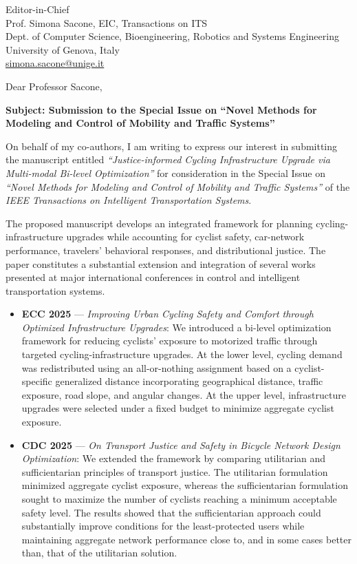 \documentclass[11pt]{letter}
\date{\today}
\begin{document}
\begin{letter}{%
Editor-in-Chief\\
Prof. Simona Sacone, EIC, Transactions on ITS\\
Dept. of Computer Science, Bioengineering, Robotics and Systems Engineering\\
University of Genova, Italy\\
\href{mailto:simona.sacone@unige.it}{simona.sacone@unige.it}
}

\opening{Dear Professor Sacone,}

\textbf{Subject: Submission to the Special Issue on
``Novel Methods for Modeling and Control of Mobility and Traffic Systems''}

On behalf of my co-authors, I am writing to express our interest in
submitting the manuscript entitled
\emph{``Justice-informed Cycling Infrastructure Upgrade via
Multi-modal Bi-level Optimization''}
for consideration in the Special Issue on
\emph{``Novel Methods for Modeling and Control of Mobility and Traffic
Systems''} of the \emph{IEEE Transactions on Intelligent Transportation
Systems}.

The proposed manuscript develops an integrated framework for planning
cycling-infrastructure upgrades while accounting for cyclist safety,
car-network performance, travelers' behavioral responses, and
distributional justice. The paper constitutes a substantial extension
and integration of several works presented at major international
conferences in control and intelligent transportation systems.

\begin{itemize}
    \item \textbf{ECC 2025} --- \textit{Improving Urban Cycling Safety and
    Comfort through Optimized Infrastructure Upgrades}:
    We introduced a bi-level optimization framework for reducing cyclists'
    exposure to motorized traffic through targeted cycling-infrastructure
    upgrades. At the lower level, cycling demand was redistributed using an
    all-or-nothing assignment based on a cyclist-specific generalized
    distance incorporating geographical distance, traffic exposure, road
    slope, and angular changes. At the upper level, infrastructure upgrades
    were selected under a fixed budget to minimize aggregate cyclist
    exposure.

    \item \textbf{CDC 2025} --- \textit{On Transport Justice and Safety in
    Bicycle Network Design Optimization}:
    We extended the framework by comparing utilitarian and sufficientarian
    principles of transport justice. The utilitarian formulation minimized
    aggregate cyclist exposure, whereas the sufficientarian formulation
    sought to maximize the number of cyclists reaching a minimum acceptable
    safety level. The results showed that the sufficientarian approach could
    substantially improve conditions for the least-protected users while
    maintaining aggregate network performance close to, and in some cases
    better than, that of the utilitarian solution.


\end{itemize}
\end{letter}
\end{document}
